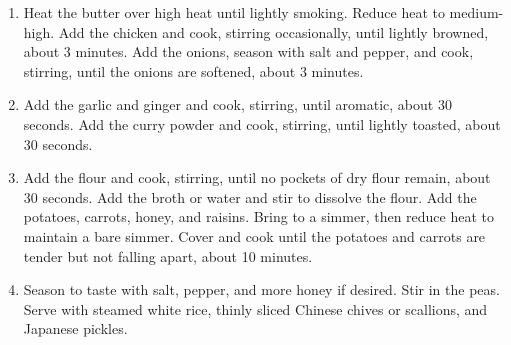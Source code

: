 \begin{enumerate}
	\item Heat the butter over high heat until lightly smoking. Reduce heat to medium-high. Add the chicken and cook, stirring occasionally, until lightly browned, about 3 minutes. Add the onions, season with salt and pepper, and cook, stirring, until the onions are softened, about 3 minutes.
	\item Add the garlic and ginger and cook, stirring, until aromatic, about 30 seconds. Add the curry powder and cook, stirring, until lightly toasted, about 30 seconds.
	\item Add the flour and cook, stirring, until no pockets of dry flour remain, about 30 seconds. Add the broth or water and stir to dissolve the flour. Add  the potatoes, carrots, honey, and raisins. Bring to a simmer, then reduce heat to maintain a bare simmer. Cover and cook until the potatoes and carrots are tender but not falling apart, about 10 minutes.
	\item Season  to taste with salt, pepper, and more honey if desired. Stir in the peas. Serve with steamed white rice, thinly sliced Chinese chives or scallions, and Japanese pickles.
\end{enumerate}
